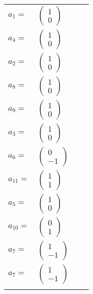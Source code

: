 \documentclass[1p]{elsarticle_modified}
\theoremstyle{definition}
\begin{document}
\begin{tabular}{m{7pt} m{180pt} m{7pt} m{180pt} }
\flushright $a_{1}=$&$\begin{pmatrix}1\\0\end{pmatrix}$ \\
\flushright $a_{4}=$&$\begin{pmatrix}1\\0\end{pmatrix}$ \\
\flushright $a_{2}=$&$\begin{pmatrix}1\\0\end{pmatrix}$ \\
\flushright $a_{8}=$&$\begin{pmatrix}1\\0\end{pmatrix}$ \\
\flushright $a_{9}=$&$\begin{pmatrix}1\\0\end{pmatrix}$ \\
\flushright $a_{3}=$&$\begin{pmatrix}1\\0\end{pmatrix}$ \\
\flushright $a_{6}=$&$\begin{pmatrix}0\\-1\end{pmatrix}$ \\
\flushright $a_{11}=$&$\begin{pmatrix}1\\1\end{pmatrix}$ \\
\flushright $a_{5}=$&$\begin{pmatrix}1\\0\end{pmatrix}$ \\
\flushright $a_{10}=$&$\begin{pmatrix}0\\1\end{pmatrix}$ \\
\flushright $a_{7}=$&$\begin{pmatrix}1\\-1\end{pmatrix}$\\ \flushright $a_{7}=$&$\begin{pmatrix}1\\-1\end{pmatrix}$\\&\end{tabular}
\end{document}
